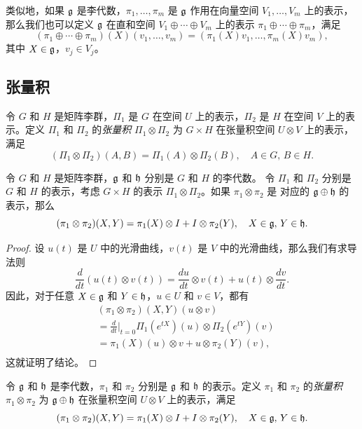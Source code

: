 类似地，如果 $\mathfrak{g}$ 是李代数，$\pi_1,\dots,\pi_m$ 是 $\mathfrak{g}$ 作用在向量空间
$V_1,\dots,V_m$ 上的表示，那么我们也可以定义 $\mathfrak{g}$ 在直和空间
$V_1\oplus \cdots \oplus V_m$ 上的表示 $\pi_1\oplus \cdots \oplus \pi_m$，满足
\[
  (\pi_1\oplus \cdots \oplus \pi_m)(X)(v_1,\dots,v_m)
  =(\pi_1(X)v_1,\dots,\pi_m(X)v_m),
\]
其中 $X\in \mathfrak{g}$，$v_j\in V_j$。

\subsection{张量积}

\begin{definition}
  令 $G$ 和 $H$ 是矩阵李群，$\Pi_1$ 是 $G$ 在空间 $U$ 上的表示，$\Pi_2$
  是 $H$ 在空间 $V$ 上的表示。定义 $\Pi_1$ 和 $\Pi_2$ 的\emph{张量积}
  $\Pi_1\otimes\Pi_2$ 为 $G\times H$ 在张量积空间 $U\otimes V$ 上的表示，满足
  \[
    (\Pi_1\otimes \Pi_2)(A,B)=\Pi_1(A)\otimes \Pi_2(B),\quad A\in G,\, B\in H.
  \]
\end{definition}

\begin{proposition}
  令 $G$ 和 $H$ 是矩阵李群，$\mathfrak{g}$ 和 $\mathfrak{h}$ 分别是 $G$ 和 $H$ 的李代数。
  令 $\Pi_1$ 和 $\Pi_2$ 分别是 $G$ 和 $H$ 的表示，考虑 $G\times H$
  的表示 $\Pi_1\otimes\Pi_2$。如果 $\pi_1\otimes\pi_2$ 是
  对应的 $\mathfrak{g}\oplus \mathfrak{h}$ 的表示，那么
  \[
    (\pi_1\otimes\pi_2)(X,Y)=\pi_1(X)\otimes I + I\otimes \pi_2(Y),\quad X\in\mathfrak{g},\, Y\in\mathfrak{h}.  
  \]
\end{proposition}
\begin{proof}
  设 $u(t)$ 是 $U$ 中的光滑曲线，$v(t)$ 是 $V$ 中的光滑曲线，那么我们有求导
  法则
  \[
    \frac{d}{dt}(u(t)\otimes v(t))=\frac{du}{dt}\otimes v(t)+u(t)\otimes \frac{dv}{dt}.
  \]
  因此，对于任意 $X\in\mathfrak{g}$ 和 $Y\in\mathfrak{h}$，$u\in U$ 和 $v\in V$，都有
  \begin{align*}
    &(\pi_1\otimes\pi_2)(X,Y)(u\otimes v) \\
    &=\frac{d}{dt}\bigg|_{t=0} \Pi_1(e^{tX})(u)\otimes \Pi_2(e^{tY})(v) \\
    &=\pi_1(X)(u)\otimes v+u\otimes \pi_2(Y)(v), \\
  \end{align*}
  这就证明了结论。
\end{proof}

\begin{definition}
  令 $\mathfrak{g}$ 和 $\mathfrak{h}$ 是李代数，$\pi_1$ 和 $\pi_2$ 分别是 $\mathfrak{g}$ 和 $\mathfrak{h}$
  的表示。定义 $\pi_1$ 和 $\pi_2$ 的\emph{张量积}
  $\pi_1\otimes \pi_2$ 为 $\mathfrak{g}\oplus \mathfrak{h}$ 在张量积空间 $U\otimes V$ 上的表示，满足
  \[
    (\pi_1\otimes \pi_2)(X,Y)=\pi_1(X)\otimes I + I\otimes \pi_2(Y),\quad X\in\mathfrak{g},\, Y\in\mathfrak{h}.  
  \]
\end{definition}

